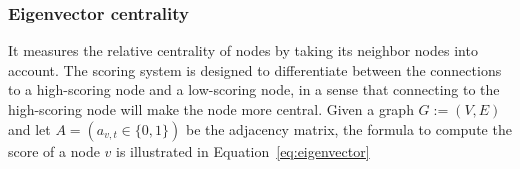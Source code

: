 



\subsubsection{Eigenvector centrality}
%
It measures the relative centrality of nodes by taking its neighbor nodes into
account. The scoring system is designed to differentiate between the
connections to a high-scoring node and a low-scoring node, in a sense that
connecting to the high-scoring node will make the node more central. Given a
graph $G:=(V,E)$ and let $A = (a_{v,t}\in\{0, 1\})$ be the adjacency matrix,
the formula to compute the score of a node $v$ is illustrated in
Equation~\eqref{eq:eigenvector}

